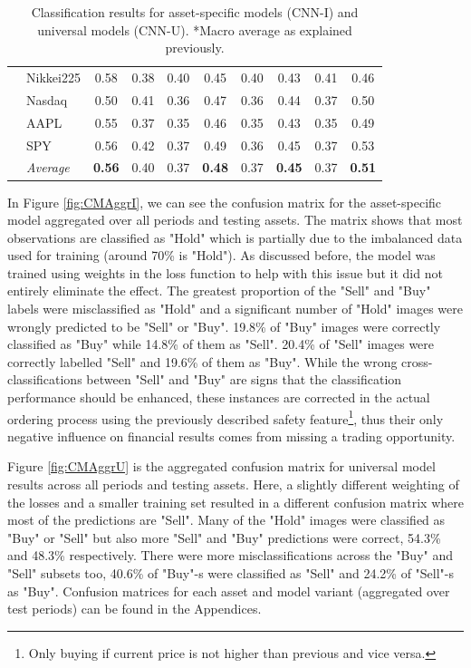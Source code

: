 \documentclass[11pt, a4paper]{article}
\begin{document}
\begin{table}[H]
\begin{tabular}{l|l|cc|cc|cc|cc}
& Nikkei225        & 0.58          & 0.38 & 0.40 & 0.45          & 0.40 & 0.43          & 0.41 & 0.46          \\
& Nasdaq           & 0.50          & 0.41 & 0.36 & 0.47          & 0.36 & 0.44          & 0.37 & 0.50          \\
& AAPL             & 0.55          & 0.37 & 0.35 & 0.46          & 0.35 & 0.43          & 0.35 & 0.49          \\
& SPY              & 0.56          & 0.42 & 0.37 & 0.49          & 0.36 & 0.45          & 0.37 & 0.53          \\ \cline{2-10}
& \textit{Average} & \textbf{0.56} & 0.40 & 0.37 & \textbf{0.48} & 0.37 & \textbf{0.45} & 0.37 & \textbf{0.51}
\end{tabular}
\caption{Classification results for asset-specific models (CNN-I) and universal models (CNN-U). *Macro average as explained previously.}
\label{tbl:ClassRes}
\end{table}

In Figure \ref{fig:CMAggrI}, we can see the confusion matrix for the asset-specific model aggregated over all periods and testing assets. The matrix shows that most observations are classified as "Hold" which is partially due to the imbalanced data used for training (around 70\% is "Hold"). As discussed before, the model was trained using weights in the loss function to help with this issue but it did not entirely eliminate the effect. The greatest proportion of the "Sell" and "Buy" labels were misclassified as "Hold" and a significant number of "Hold" images were wrongly predicted to be "Sell" or "Buy". 19.8\% of "Buy" images were correctly classified as "Buy" while 14.8\% of them as "Sell". 20.4\% of "Sell" images were correctly labelled "Sell" and 19.6\% of them as "Buy". While the wrong cross-classifications between "Sell" and "Buy" are signs that the classification performance should be enhanced, these instances are corrected in the actual ordering process using the previously described safety feature\footnote{Only buying if current price is not higher than previous and vice versa.}, thus their only negative influence on financial results comes from missing a trading opportunity.

Figure \ref{fig:CMAggrU} is the aggregated confusion matrix for universal model results across all periods and testing assets. Here, a slightly different weighting of the losses and a smaller training set resulted in a different confusion matrix where most of the predictions are "Sell". Many of the "Hold" images were classified as "Buy" or "Sell" but also more "Sell" and "Buy" predictions were correct, 54.3\% and 48.3\% respectively. There were more misclassifications across the "Buy" and "Sell" subsets too, 40.6\% of "Buy"-s were classified as "Sell" and 24.2\% of "Sell"-s as "Buy". Confusion matrices for each asset and model variant (aggregated over test periods) can be found in the Appendices.
\end{document}
